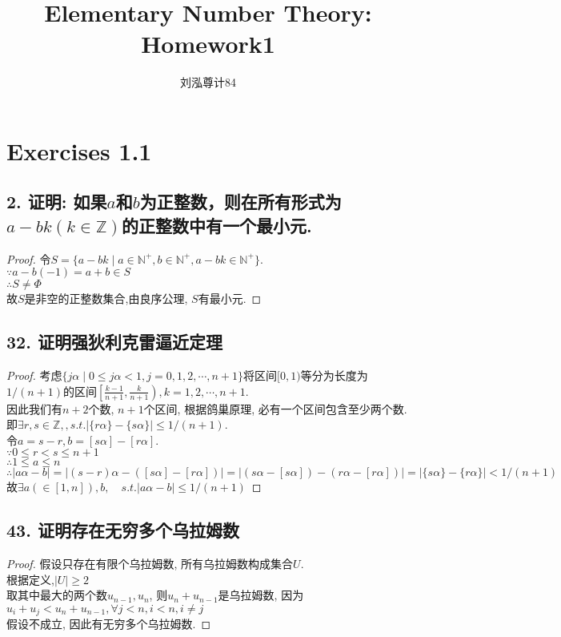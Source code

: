 \documentclass[UTF8, onecolumn, a4paper]{article}
\title{\textbf{Elementary Number Theory: Homework1}}%
\author{刘泓尊\quad 2018011446\quad 计84 }
\begin{document}
\maketitle

\section*{Exercises 1.1}
\subsection*{2. 证明: 如果$a$和$b$为正整数，则在所有形式为$a - bk(k\in \mathbb{Z})$的正整数中有一个最小元.}
\begin{proof}
令$S = \{a - bk \mid a\in \mathbb{N^+}, b\in \mathbb{N^+}, a-bk\in\mathbb{N^+}\}$.\\
$\because a - b(-1) = a+b\in S$\\
$\therefore S \neq \Phi$\\
故$S$是非空的正整数集合,由良序公理, $S$有最小元.
\end{proof}

\subsection*{32. 证明强狄利克雷逼近定理}
\begin{proof}
考虑$\{j\alpha \mid 0 \leq j\alpha < 1, j = 0, 1, 2, \cdots , n+1\}$将区间$[0,1)$等分为长度为$1 / (n+1)$的区间$\left[\frac{k-1}{n+1}, \frac{k}{n+1}\right), k = 1, 2, \cdots , n+1$. \\
因此我们有$n+2$个数, $n+1$个区间, 根据鸽巢原理, 必有一个区间包含至少两个数. \\即$\exists r, s \in \mathbb{Z}, , s.t.|\{r\alpha\} - \{s\alpha\}| \leq 1 / (n+1)$.\\
令$a = s - r, b = [s\alpha] - [r\alpha]$.\\
$\because 0\leq r < s \leq n+1$\\
$\therefore 1 \leq a \leq n$\\
$\therefore |a\alpha - b| = |(s-r)\alpha - ([s\alpha] - [r\alpha])| = |(s\alpha - [s\alpha]) - (r\alpha - [r\alpha])| = |\{s\alpha\} - \{r\alpha\}| < 1/(n+1)$
故$\exists a(\in [1, n]), b,\quad s.t.|a\alpha - b| \leq 1/(n+1)$
\end{proof}
\subsection*{43. 证明存在无穷多个乌拉姆数}
\begin{proof}
假设只存在有限个乌拉姆数, 所有乌拉姆数构成集合$U$.\\
根据定义,$|U| \geq 2$\\
取其中最大的两个数$u_{n-1}, u_n$, 则$u_n+u_{n-1}$是乌拉姆数, 因为$u_i + u_j < u_n + u_{n-1}, \forall j < n, i < n, i\neq j$\\
假设不成立, 因此有无穷多个乌拉姆数.
\end{proof}
\end{document}
